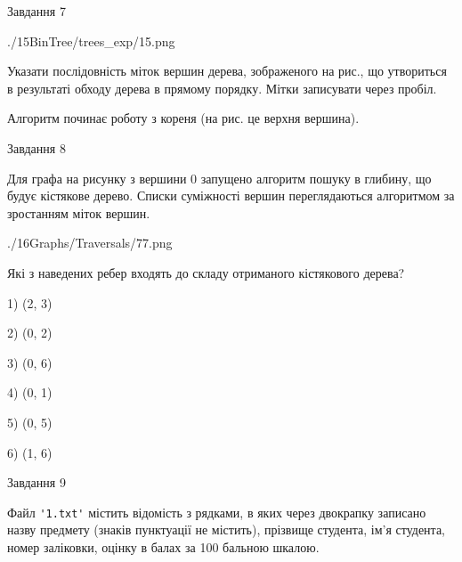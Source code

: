 \documentclass[12pt, ukrainian]{article}
\def\code#1{\Verb!#1!}
\begin{document}
{\vspace{10mm}\par

\newpage
\begin{minipage}[t]{9.7cm}
               
{\begin{center}Завдання {7}\end{center}}
\vspace{-6mm}

\begin{center}
	{./15BinTree/trees_exp/15.png}
\end{center}
Указати послідовність міток вершин дерева, зображеного на рис., що утвориться в результаті обходу дерева в прямому порядку. Мітки записувати через пробіл.\par Алгоритм починає роботу з кореня (на рис. це верхня вершина).\par

\end{minipage}
\vline \hspace{8mm}
\begin{minipage}[t]{8.0cm}
               
{\begin{center}Завдання {8}\end{center}}
\vspace{-6mm}
Для графа на рисунку з вершини 0 запущено алгоритм пошуку в глибину, що будує кістякове дерево. Списки суміжності вершин переглядаються алгоритмом за зростанням міток вершин.\par
\begin{center}
	{./16Graphs/Traversals/77.png}
\end{center}
\par Які з наведених ребер входять до складу отриманого кістякового дерева?\par
1) (2, 3)\par
2) (0, 2)\par
3) (0, 6)\par
4) (0, 1)\par
5) (0, 5)\par
6) (1, 6)\par
{\vskip 15pt} \par

\end{minipage}

               
{\begin{center}Завдання {9}\end{center}}
\vspace{-6mm}
Файл \code{'1.txt'} містить відомість з рядками, в яких через двокрапку записа\-но назву предмету (знаків пунктуації не містить), прізвище студента, ім'я студента, номер залі\-ков\-ки, оцінку в балах за 100 бальною шкалою.

}
\end{document}
